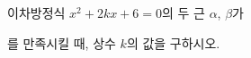 이차방정식 $x^2+2kx+6=0$의 두 근 $\alpha$, $\beta$가 \par\smallskip{}\par\smallskip\noindent 를 만족시킬 때, 상수 $k$의 값을 구하시오. 
